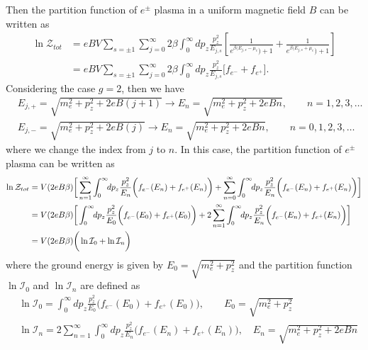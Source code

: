 \documentclass[sn-mathphys,Numbered]{sn-jnl}
\theoremstyle{thmstyleone}%
\theoremstyle{thmstyletwo}%
\theoremstyle{thmstylethree}%
\begin{document}
Then the partition function of $e^\pm$ plasma in a uniform magnetic field $B$ can be written as
\begin{align}
\ln\mathcal{Z}_{tot}&=eBV\sum_{s=\pm1}\sum_{j=0}^\infty2\beta\int_0^\infty\!\!dp_z \frac{p_z^2}{E_{j,s}}\left[\frac{1}{e^{\beta(E_{j,s}-\mu_e})+1}+\frac{1}{e^{\beta(E_{j,s}+\mu_e})+1}\right]\\
&=eBV\sum_{s=\pm1}\sum_{j=0}^\infty2\beta\int_0^\infty\!\!dp_z \frac{p_z^2}{E_{j,s}}\bigg[f_{e^-}+f_{e^+}\bigg].
\end{align}
Considering the case {\color{blue}$g=2$}, then we have
\begin{align}
 &E_{j,+}=\sqrt{{m}_e^2+p^2_z+2eB\left(j+1\right)}\longrightarrow E_{n}=\sqrt{{m}_e^2+p^2_z+2eBn},\qquad n=1,2,3,\dots\\
 &E_{j,-}=\sqrt{{m}_e^2+p^2_z+2eB\left(j\right)}\longrightarrow E_{n}=\sqrt{{m}_e^2+p^2_z+2eBn},\qquad n=0,1,2,3,\dots
\end{align}
where we change the index from $j$ to $n$. In this case, the partition function of $e^\pm$ plasma can be written as
\begin{align}
\ln\mathcal{Z}_{tot}&=V(2eB\beta) \bigg[ \sum_{n=1}^\infty\int_0^\infty\!\!dp_z \frac{p_z^2}{E_{n}}\bigg(f_{e^-}(E_n)+f_{e^+}(E_n)\bigg)+\sum_{n=0}^\infty\int_0^\infty\!\!dp_z \frac{p_z^2}{E_{n}}\bigg(f_{e^-}(E_n)+f_{e^+}(E_n)\bigg)\bigg]\notag\\
&=V(2eB\beta) \bigg[\int_0^\infty\!\!dp_z \frac{p_z^2}{E_0}\bigg(f_{e^-}(E_0)+f_{e^+}(E_0)\bigg)+2 \sum_{n=1}^\infty\int_0^\infty\!\!dp_z \frac{p_z^2}{E_{n}}\bigg(f_{e^-}(E_n)+f_{e^+}(E_n)\bigg)\bigg]\notag\\
&=V(2eB\beta)\bigg(\ln\mathcal{I}_{0}+\ln\mathcal{I}_{n}\bigg)
\end{align}
where the ground energy is given by $E_0=\sqrt{{m}_e^2+p^2_z}$ and the partition function $\ln\mathcal{I}_{0}$ and $\ln\mathcal{I}_{n}$ are defined as
\begin{align}
&\ln\mathcal{I}_{0}=\int_0^\infty\!\!dp_z \frac{p_z^2}{E_0}\bigg(f_{e^-}(E_0)+f_{e^+}(E_0)\bigg),\qquad E_0=\sqrt{{m}_e^2+p^2_z} \\
&\ln\mathcal{I}_{n}=2 \sum_{n=1}^\infty\int_0^\infty\!\!dp_z \frac{p_z^2}{E_{n}}\bigg(f_{e^-}(E_n)+f_{e^+}(E_n)\bigg),\quad E_n=\sqrt{{m}_e^2+p^2_z+2eBn}
\end{align}
\end{document}
